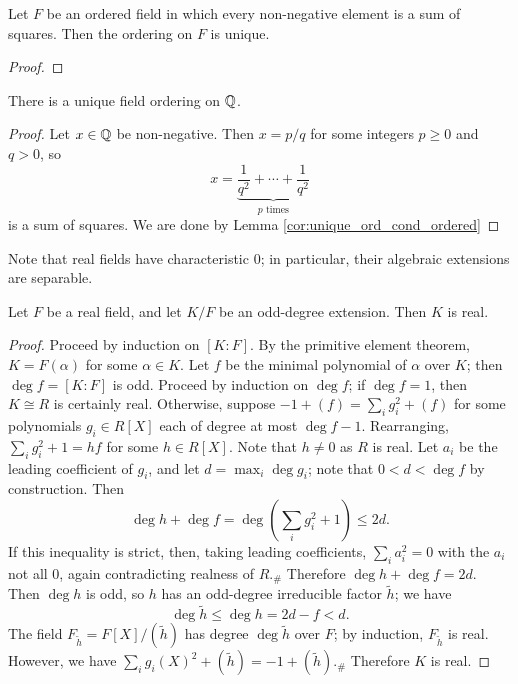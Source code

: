 \begin{corollary}
  \label{cor:unique_ord_cond_ordered}
  \leanok
  Let $F$ be an ordered field in which every non-negative element is a sum of squares. Then the ordering on $F$ is unique.
\end{corollary}
\begin{proof}
  \leanok
\end{proof}

\begin{corollary}
  \label{cor:unique_ord_Q}
  There is a unique field ordering on $\mathbb{Q}$.
\end{corollary}
\begin{proof}
  Let $x\in\mathbb{Q}$ be non-negative. Then $x=p/q$ for some integers $p\geq0$ and $q>0$, so 
  \[x=\underbrace{\frac{1}{q^2}+\cdots+\frac{1}{q^2}}_{p\text{ times}}\]
  is a sum of squares. We are done by Lemma \ref{cor:unique_ord_cond_ordered}
\end{proof}

Note that real fields have characteristic 0; in particular, their algebraic extensions are separable.

\begin{lemma}
  \label{lem:odd_deg_real}
  Let $F$ be a real field, and let $K/F$ be an odd-degree extension. Then $K$ is real.
\end{lemma}
\begin{proof}
  Proceed by induction on $[K:F]$. By the primitive element theorem, $K=F(\alpha)$ for some $\alpha\in K$. Let $f$ be the minimal polynomial of $\alpha$ over $K$; then $\deg f=[K:F]$ is odd. Proceed by induction on $\deg f$; if $\deg f=1$, then $K\cong R$ is certainly real. Otherwise, suppose $-1+(f)=\sum_ig_i^2+(f)$ for some polynomials $g_i\in R[X]$ each of degree at most $\deg f-1$. Rearranging, $\sum_ig_i^2+1=hf$ for some $h\in R[X]$. Note that $h\neq0$ as $R$ is real. Let $a_i$ be the leading coefficient of $g_i$, and let $d=\max_i\deg g_i$; note that $0<d<\deg f$ by construction. Then
  \[\deg h+\deg f=\deg(\sum_i g_i^2+1)\leq 2d.\]
  If this inequality is strict, then, taking leading coefficients, $\sum_i a_i^2=0$ with the $a_i$ not all 0, again contradicting realness of $R$.$_\#$ Therefore $\deg h+\deg f=2d$. Then $\deg h$ is odd, so $h$ has an odd-degree irreducible factor $\tilde h$; we have
  \[\deg\tilde h\leq\deg h=2d-f<d.\]
  The field $F_{\tilde h}=F[X]/(\tilde h)$ has degree $\deg\tilde h$ over $F$; by induction, $F_{\tilde h}$ is real. However, we have $\sum_i g_i(X)^2+(\tilde h)=-1+(\tilde h)$.$_\#$ Therefore $K$ is real.
\end{proof}

